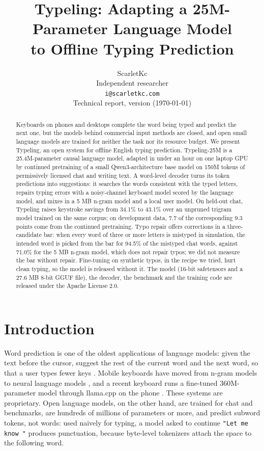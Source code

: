 \documentclass[11pt]{article}
\title{Typeling: Adapting a 25M-Parameter Language Model\\to Offline Typing Prediction}
\author{ScarletKc \\
  Independent researcher \\
  \texttt{i@scarletkc.com} \\[1ex]
  {\normalfont\normalsize Technical report, version \typelingversion{} (\today)}}
\begin{document}
\maketitle

\begin{abstract}
Keyboards on phones and desktops complete the word being typed and predict the next one, but the models behind
commercial input methods are closed, and open small language models are trained for neither the task nor its
resource budget. We present Typeling, an open system for offline English typing prediction. Typeling-25M is a
25.4M-parameter causal language model, adapted in under an hour on one laptop GPU by continued pretraining of a small
Qwen3-architecture base model on 150M tokens of permissively licensed chat and writing text. A word-level decoder
turns its token predictions into suggestions: it searches the words consistent with the typed letters, repairs
typing errors with a noisy-channel keyboard model scored by the language model, and mixes in a 5 MB n-gram model and
a local user model. On held-out chat, Typeling raises keystroke savings from 34.1\% to 43.1\% over an unpruned
trigram model trained on the same corpus; on development data, 7.7 of the corresponding 9.3 points come from the
continued pretraining. Typo repair offers corrections in a three-candidate bar: when every word of three or more
letters is mistyped in simulation, the intended word is picked from the bar for 94.5\% of the mistyped chat words,
against 71.0\% for the 5 MB n-gram model, which does not repair typos; we did not measure the bar without repair.
Fine-tuning on synthetic typos, in the
recipe we tried, hurt clean typing, so the model is released without it. The model (16-bit safetensors and a
27.6 MB 8-bit GGUF file), the decoder, the benchmark and the training code are released under the Apache License 2.0.
\end{abstract}

\section{Introduction}

Word prediction is one of the oldest applications of language models: given the text before the cursor, suggest the
rest of the current word and the next word, so that a user types fewer keys
\citep{garay-vitoria-abascal-2006-text}. Mobile keyboards have moved from n-gram models to neural language models
\citep{yu-etal-2018-device,hard-etal-2018-federated,zhang-etal-2024-neural}, and a recent keyboard runs a
fine-tuned 360M-parameter model through llama.cpp on the phone \citep{lexo-2026}. These systems are proprietary. Open
language models, on the other hand, are trained for chat and benchmarks, are hundreds of millions of parameters or
more, and predict subword tokens, not words: used naively for typing, a model asked to continue \texttt{"Let me know
"} produces punctuation, because byte-level tokenizers attach the space to the following word.
\end{document}

